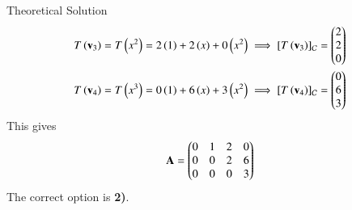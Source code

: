 \documentclass{beamer}
\begin{document}
\begin{frame}{Theoretical Solution}
\begin{align}
    T\left(\mathbf{v}_3\right) = T\left(x^2\right) &= 2\left(1\right) + 2\left(x\right) + 0\left(x^2\right) \implies [T\left(\mathbf{v}_3\right)]_\mathcal{C} = \begin{pmatrix}2 \\ 2 \\ 0\end{pmatrix} \\
    T\left(\mathbf{v}_4\right) = T\left(x^3\right) &= 0\left(1\right) + 6\left(x\right) + 3\left(x^2\right) \implies [T\left(\mathbf{v}_4\right)]_\mathcal{C} = \begin{pmatrix}0 \\ 6 \\ 3\end{pmatrix}
\end{align}
This gives
\begin{align}
    \mathbf{A} = \begin{pmatrix}0 & 1 & 2 & 0 \\ 0 & 0 & 2 & 6 \\ 0 & 0 & 0 & 3\end{pmatrix}
\end{align}
The correct option is \textbf{2)}.
\end{frame}
\end{document}
